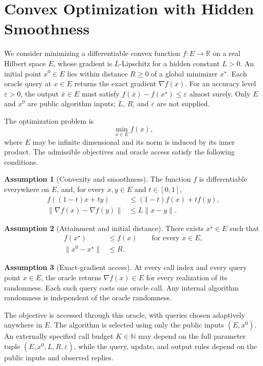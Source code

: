 \documentclass[10pt]{article}
\theoremstyle{definition}
\newtheorem{assumption}{Assumption}
\begin{document}
\section*{Convex Optimization with Hidden Smoothness}
We consider minimizing a differentiable convex function $f:E\to\mathbb{R}$ on a real Hilbert space $E$, whose gradient is $L$-Lipschitz for a hidden constant $L>0$. An initial point $x^0\in E$ lies within distance $R\geq 0$ of a global minimizer $x^\star$. Each oracle query at $x\in E$ returns the exact gradient $\nabla f(x)$. For an accuracy level $\varepsilon>0$, the output $\bar{x}\in E$ must satisfy $f(\bar{x})-f(x^\star)\leq\varepsilon$ almost surely. Only $E$ and $x^0$ are public algorithm inputs; $L$, $R$, and $\varepsilon$ are not supplied.

The optimization problem is
\begin{equation}
\label{eq:problem}
\min_{x\in E} f(x),
\end{equation}
where $E$ may be infinite dimensional and its norm is induced by its inner product. The admissible objectives and oracle access satisfy the following conditions.

\begin{assumption}[Convexity and smoothness]
The function $f$ is differentiable everywhere on $E$, and, for every $x,y\in E$ and $t\in[0,1]$,
\begin{align}
f((1-t)x+ty) &\leq (1-t)f(x)+tf(y),\\
\|\nabla f(x)-\nabla f(y)\| &\leq L\|x-y\|.
\end{align}
\end{assumption}

\begin{assumption}[Attainment and initial distance]
There exists $x^\star\in E$ such that
\begin{align}
f(x^\star) &\leq f(x) \qquad \text{for every }x\in E,\\
\|x^0-x^\star\| &\leq R.
\end{align}
\end{assumption}

\begin{assumption}[Exact-gradient access]
At every call index and every query point $x\in E$, the oracle returns $\nabla f(x)\in E$ for every realization of its randomness. Each such query costs one oracle call. Any internal algorithm randomness is independent of the oracle randomness.
\end{assumption}

The objective is accessed through this oracle, with queries chosen adaptively anywhere in $E$. The algorithm is selected using only the public inputs $(E,x^0)$. An externally specified call budget $K\in\mathbb{N}$ may depend on the full parameter tuple $(E,x^0,L,R,\varepsilon)$, while the query, update, and output rules depend on the public inputs and observed replies.
\end{document}
